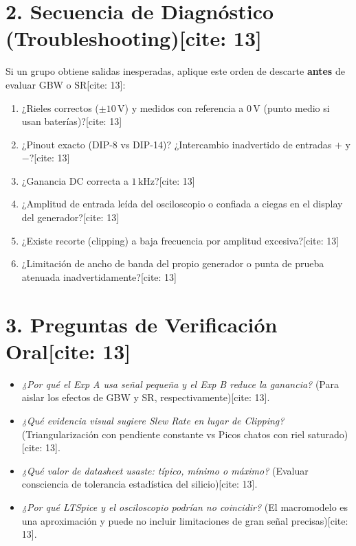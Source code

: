 \documentclass[11pt, a4paper]{article}
\begin{document}
\section*{2. Secuencia de Diagnóstico (Troubleshooting)[cite: 13]}
Si un grupo obtiene salidas inesperadas, aplique este orden de descarte \textbf{antes} de evaluar GBW o SR[cite: 13]:
\begin{enumerate}
    \setlength{\itemsep}{0pt}
    \item ¿Rieles correctos ($\pm10\,\text{V}$) y medidos con referencia a $0\,\text{V}$ (punto medio si usan baterías)?[cite: 13]
    \item ¿Pinout exacto (DIP-8 vs DIP-14)? ¿Intercambio inadvertido de entradas $+$ y $-$?[cite: 13]
    \item ¿Ganancia DC correcta a $1\,\text{kHz}$?[cite: 13]
    \item ¿Amplitud de entrada leída del osciloscopio o confiada a ciegas en el display del generador?[cite: 13]
    \item ¿Existe recorte (clipping) a baja frecuencia por amplitud excesiva?[cite: 13]
    \item ¿Limitación de ancho de banda del propio generador o punta de prueba atenuada inadvertidamente?[cite: 13]
\end{enumerate}

\section*{3. Preguntas de Verificación Oral[cite: 13]}
\begin{itemize}
    \item \textit{¿Por qué el Exp A usa señal pequeña y el Exp B reduce la ganancia?} (Para aislar los efectos de GBW y SR, respectivamente)[cite: 13].
    \item \textit{¿Qué evidencia visual sugiere Slew Rate en lugar de Clipping?} (Triangularización con pendiente constante vs Picos chatos con riel saturado)[cite: 13].
    \item \textit{¿Qué valor de datasheet usaste: típico, mínimo o máximo?} (Evaluar consciencia de tolerancia estadística del silicio)[cite: 13].
    \item \textit{¿Por qué LTSpice y el osciloscopio podrían no coincidir?} (El macromodelo es una aproximación y puede no incluir limitaciones de gran señal precisas)[cite: 13].
\end{itemize}
\end{document}
